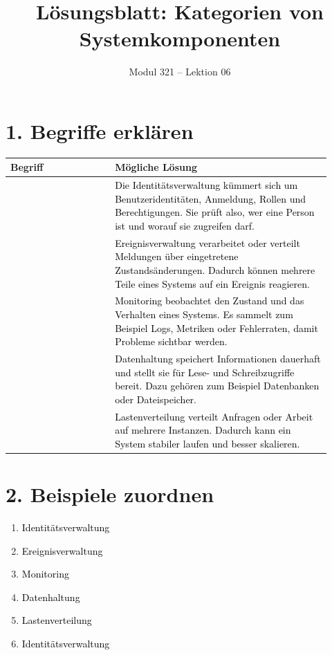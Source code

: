 \documentclass[11pt,a4paper]{article}
\title{\textbf{Lösungsblatt: Kategorien von Systemkomponenten}}
\author{Modul 321 -- Lektion 06}
\date{}
\newcommand{\term}[1]{\fcolorbox{black!20}{blue!6}{\strut #1}}
\newcommand{\solution}[1]{\textcolor{black}{#1}}
\begin{document}
\maketitle


\section*{1. Begriffe erklären}
\begin{longtable}{|>{\raggedright\arraybackslash}p{0.30\linewidth}|>{\raggedright\arraybackslash}p{0.62\linewidth}|}
\hline
\textbf{Begriff} & \textbf{Mögliche Lösung} \\
\hline
\term{Identitätsverwaltung} &
\solution{Die Identitätsverwaltung kümmert sich um Benutzeridentitäten, Anmeldung, Rollen und Berechtigungen. Sie prüft also, wer eine Person ist und worauf sie zugreifen darf.} \\ \hline
\term{Ereignisverwaltung} &
\solution{Ereignisverwaltung verarbeitet oder verteilt Meldungen über eingetretene Zustandsänderungen. Dadurch können mehrere Teile eines Systems auf ein Ereignis reagieren.} \\ \hline
\term{Monitoring} &
\solution{Monitoring beobachtet den Zustand und das Verhalten eines Systems. Es sammelt zum Beispiel Logs, Metriken oder Fehlerraten, damit Probleme sichtbar werden.} \\ \hline
\term{Datenhaltung} &
\solution{Datenhaltung speichert Informationen dauerhaft und stellt sie für Lese- und Schreibzugriffe bereit. Dazu gehören zum Beispiel Datenbanken oder Dateispeicher.} \\ \hline
\term{Lastenverteilung} &
\solution{Lastenverteilung verteilt Anfragen oder Arbeit auf mehrere Instanzen. Dadurch kann ein System stabiler laufen und besser skalieren.} \\ \hline
\end{longtable}

\section*{2. Beispiele zuordnen}
\begin{enumerate}
  \item \solution{Identitätsverwaltung}
  \item \solution{Ereignisverwaltung}
  \item \solution{Monitoring}
  \item \solution{Datenhaltung}
  \item \solution{Lastenverteilung}
  \item \solution{Identitätsverwaltung}
\end{enumerate}
\end{document}
